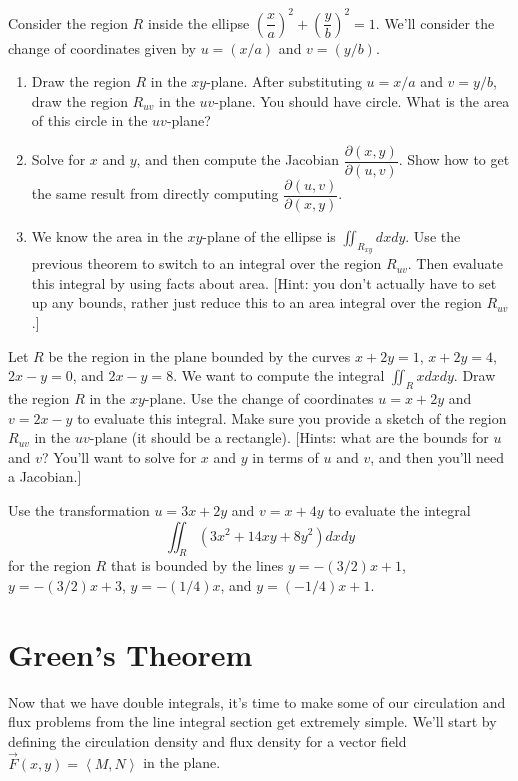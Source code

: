 \begin{problem}
 Consider the region $R$ inside the ellipse $\left(\dfrac{x}{a}\right)^2+\left(\dfrac{y}{b}\right)^2=1$.  We'll consider the change of coordinates given by $u=(x/a)$ and $v=(y/b)$.
\begin{enumerate}
 \item Draw the region $R$ in the $xy$-plane.  After substituting $u=x/a$ and $v=y/b$, draw the region $R_{uv}$ in the $uv$-plane.  You should have circle.  What is the area of this circle in the $uv$-plane?
 \item Solve for $x$ and $y$, and then compute the Jacobian  $\dfrac{\partial (x,y)}{\partial (u,v)}$. Show how to get the same result from directly computing $\dfrac{\partial (u,v)}{\partial (x,y)}$.
 \item We know the area in the $xy$-plane of the ellipse is $\iint_{R_{xy}} dxdy$. Use the previous theorem to switch to an integral over the region $R_{uv}$.  Then evaluate this integral by using facts about area. [Hint: you don't actually have to set up any bounds, rather just reduce this to an area integral over the region $R_{uv}$.] 
\end{enumerate}

\end{problem}


\begin{problem}
Let $R$ be the region in the plane bounded by the curves $x+2y=1$, $x+2y=4$, $2x-y=0$, and $2x-y=8$.  We want to compute the integral $\iint_R xdxdy$. Draw the region $R$ in the $xy$-plane. Use the change of coordinates $u=x+2y$ and $v=2x-y$ to evaluate this integral. Make sure you provide a sketch of the region $R_{uv}$ in the $uv$-plane (it should be a rectangle).  
[Hints: what are the bounds for $u$ and $v$?  You'll want to solve for $x$ and $y$ in terms of $u$ and $v$, and then you'll need a Jacobian.]
\end{problem}


\begin{problem}
 Use the transformation $u=3x+2y$ and $v=x+4y$ to evaluate the integral $$\iint_R (3x^2+14xy+8y^2)dxdy$$ for the region $R$ that is bounded by the lines $y=-(3/2)x+1$, $y=-(3/2)x+3$, $y=-(1/4)x$, and  $y=(-1/4)x+1$.
\end{problem}

\section{Green's Theorem}
Now that we have double integrals, it's time to make some of our circulation and flux problems from the line integral section get extremely simple. We'll start by defining the circulation density and flux density for a vector field $\vec F(x,y)=\left<M,N\right>$ in the plane.

